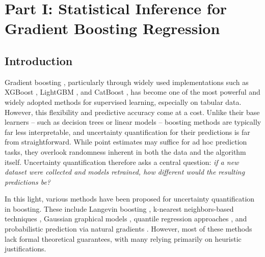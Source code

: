 \section{Part I: Statistical Inference for Gradient Boosting Regression}
\label{sec:ch06-part1}
\subsection{Introduction}
\vspace{-1ex}

Gradient boosting \citep{friedman2001greedy}, particularly through widely used implementations such as XGBoost \citep{chen2016xgboost}, LightGBM \citep{ke2017lightgbm}, and CatBoost \citep{catboost2018}, has become one of the most powerful and widely adopted methods for supervised learning, especially on tabular data. However, this flexibility and predictive accuracy come at a cost. Unlike their base learners -- such as decision trees or linear models -- boosting methods are typically far less interpretable, and uncertainty quantification for their predictions is far from straightforward. While point estimates may 
suffice for ad hoc prediction tasks, they overlook randomness inherent in both the data and the 
algorithm itself. Uncertainty quantification therefore asks a central question: \emph{if a new dataset were collected 
and models retrained, how different would the resulting predictions be?}

In this light, various methods have been proposed for uncertainty quantification in boosting. These include Langevin boosting \citep{tan2023uqboosting, ustimenko2022sglbstochasticgradientlangevin, malinin2021uncertaintygradientboostingensembles}, k-nearest neighbors-based techniques \citep{brophy2022boostinguq}, Gaussian graphical models \citep{chen2022boostinguq}, quantile regression approaches \citep{yin2023quantileextremegradientboosting}, and probabilistic prediction via natural gradients \citep{duan2020ngboostnaturalgradientboosting}. However, most of these methods lack formal theoretical guarantees, with many relying primarily on heuristic justifications.



